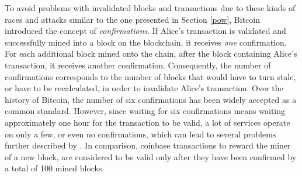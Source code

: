 \documentclass[a4paper,12pt,twoside]{report}
\begin{document}
To avoid problems with invalidated blocks and transactions due to these kinds of races and attacks similar to the one presented in Section \ref{pow}, Bitcoin introduced the concept of \textit{confirmations}. If Alice's transaction is validated and successfully mined into a block on the blockchain, it receives \textit{one} confirmation. For each additional block mined onto the chain, after the block containing Alice's transaction, it receives another confirmation. Consequently, the number of confirmations corresponds to the number of blocks that would have to turn stale, or have to be recalculated, in order to invalidate Alice's transaction. Over the history of Bitcoin, the number of six confirmations has been widely accepted as a common standard. However, since waiting for six confirmations means waiting approximately one hour for the transaction to be valid, a lot of services operate on only a few, or even no confirmations, which can lead to several problems further described by \cite{premining1}. In comparison, coinbase transactions to reward the miner of a new block, are considered to be valid only after they have been confirmed by a total of 100 mined blocks. \cite{antonopoulos2017mastering}
\end{document}
